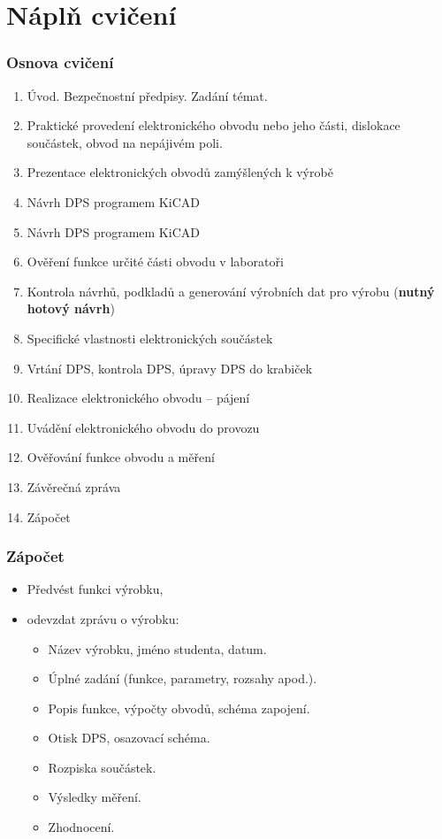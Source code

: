 \documentclass{beamer}
\begin{document}
\section{\texorpdfstring{Náplň cvičení}{Napln Cviceni}}
  \begin{frame}
    \frametitle{Osnova cvičení}
		\begin{enumerate}
          \small
          \item Úvod. Bezpečnostní předpisy. Zadání témat.
          \item Praktické provedení elektronického obvodu nebo jeho části, dislokace součástek, obvod na nepájivém poli.
          \item Prezentace elektronických obvodů zamýšlených k výrobě
          \item Návrh DPS programem KiCAD
          \item Návrh DPS programem KiCAD
          \item Ověření funkce určité části obvodu v laboratoři
          \item Kontrola návrhů, podkladů a generování výrobních dat pro výrobu (\textbf{nutný hotový návrh})
          \item Specifické vlastnosti elektronických součástek
          \item Vrtání DPS, kontrola DPS, úpravy DPS do krabiček
          \item Realizace elektronického obvodu – pájení 
          \item Uvádění elektronického obvodu do provozu
          \item Ověřování funkce obvodu a měření
          \item Závěrečná zpráva
          \item Zápočet
		\end{enumerate}
	
	\end{frame}
	\begin{frame}
    \frametitle{Zápočet}
		
		\begin{itemize}
			\item Předvést funkci výrobku,
			\item odevzdat zprávu o výrobku:
      
      \begin{itemize}
        \item Název výrobku, jméno studenta, datum.
        \item Úplné zadání (funkce, parametry, rozsahy apod.).
        \item Popis funkce, výpočty obvodů, schéma zapojení.
        \item Otisk DPS, osazovací schéma.
        \item Rozpiska součástek.
        \item Výsledky měření.
        \item Zhodnocení.
      \end{itemize}
		\end{itemize}
	
	\end{frame}
\end{document}
